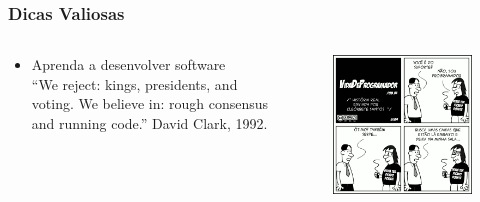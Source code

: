 \begin{frame}
    \frametitle{Dicas Valiosas}
    \begin{columns}
        \begin{column}{0.6\linewidth}
            \begin{itemize}
                \item Aprenda a desenvolver software \\
                \vspace{1cm}
                {\small
                ``We reject: kings, presidents, and voting. We believe in: rough consensus and running code.'' David Clark, 1992.
                }
            \end{itemize}
        \end{column}
        \begin{column}{0.5\linewidth}
            \begin{figure}
                \centering
                \includegraphics[width=\linewidth]{figs/vida_programador_tirinha169.png}

\end{figure}
\end{column}
\end{columns}
\end{frame}
